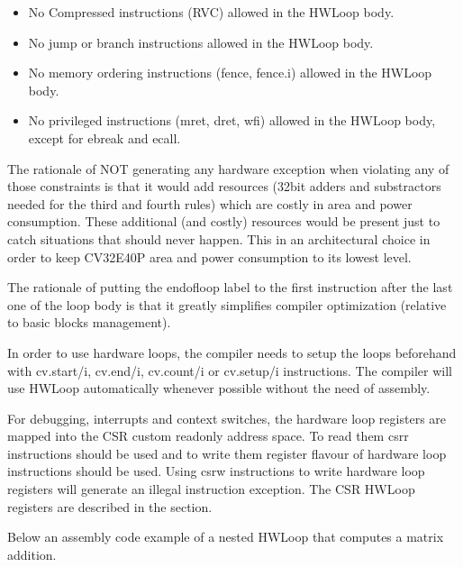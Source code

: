 \documentclass[letterpaper,10pt,english]{sphinxmanual}
\begin{document}
\begin{itemize}
\item {} 
\sphinxAtStartPar
No Compressed instructions (RVC) allowed in the HWLoop body.

\item {} 
\sphinxAtStartPar
No jump or branch instructions allowed in the HWLoop body.

\item {} 
\sphinxAtStartPar
No memory ordering instructions (fence, fence.i) allowed in the HWLoop body.

\item {} 
\sphinxAtStartPar
No privileged instructions (mret, dret, wfi) allowed in the HWLoop body, except for ebreak and ecall.

\end{itemize}

\sphinxAtStartPar
The rationale of NOT generating any hardware exception when violating any of those constraints is that it would add resources
(32\sphinxhyphen{}bit adders and substractors needed for the third and fourth rules) which are costly in area and power consumption.
These additional (and costly) resources would be present just to catch situations that should never happen.
This in an architectural choice in order to keep CV32E40P area and power consumption to its lowest level.

\sphinxAtStartPar
The rationale of putting the end\sphinxhyphen{}of\sphinxhyphen{}loop label to the first instruction after the last one of the loop body
is that it greatly simplifies compiler optimization (relative to basic blocks management).

\sphinxAtStartPar
In order to use hardware loops, the compiler needs to setup the loops beforehand with cv.start/i, cv.end/i, cv.count/i or cv.setup/i instructions.
The compiler will use HWLoop automatically whenever possible without the need of assembly.

\sphinxAtStartPar
For debugging, interrupts and context switches, the hardware loop registers are mapped into the CSR custom read\sphinxhyphen{}only address space.
To read them csrr instructions should be used and to write them register flavour of hardware loop instructions should be used.
Using csrw instructions to write hardware loop registers will generate an illegal instruction exception.
The CSR HWLoop registers are described in the {\hyperref[\detokenize{control_status_registers:cs-registers}]{}} section.

\sphinxAtStartPar
Below an assembly code example of a nested HWLoop that computes a matrix addition.
\end{document}
